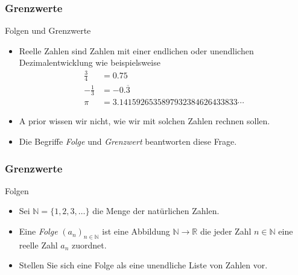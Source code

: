 \documentclass{beamer}
\title[Annuma]{\mytitle}
\author[Amin Coja-Oghlan]{Amin Coja-Oghlan}
\institute[Frankfurt]{JWGUFFM}
\date{}
\renewcommand{\emph}[1]{{\textcolor{solarizedRed}{\itshape #1}}}
\newcommand\NN{\mathbb N}
\newcommand\RR{\mathbb R}
\newcommand{\ue}{\"u}
\newcommand{\mytitle}{Grenzwerte}
\begin{document}
\frame[plain]{\titlepage}

\begin{frame}\frametitle{\mytitle}
	\begin{block}{Folgen und Grenzwerte}
		\begin{itemize}
			\item Reelle Zahlen sind Zahlen mit einer endlichen oder unendlichen Dezimalentwicklung wie beispielsweise
				\begin{align*}
					\frac{3}{4}&=0.75\\
					-\frac{1}{3}&=-0.\overline 3\\
					\pi&=3.1415926535897932384626433833\cdots
				\end{align*}
			\item A prior wissen wir nicht, wie wir mit solchen Zahlen rechnen sollen.
			\item Die Begriffe \emph{Folge} und \emph{Grenzwert} beantworten diese Frage.
		\end{itemize}
	\end{block}
\end{frame}

\begin{frame}\frametitle{\mytitle}
	\begin{block}{Folgen}
		\begin{itemize}
			\item Sei $\NN=\{1,2,3,\ldots\}$ die Menge der nat\ue rlichen Zahlen.
			\item Eine \emph{Folge} $(a_n)_{n\in\NN}$ ist eine Abbildung $\NN\to\RR$ die jeder Zahl $n\in\NN$ eine reelle Zahl $a_n$ zuordnet.
			\item Stellen Sie sich eine Folge als eine unendliche Liste von Zahlen vor.
		\end{itemize}
	\end{block}
\end{frame}
\end{document}

